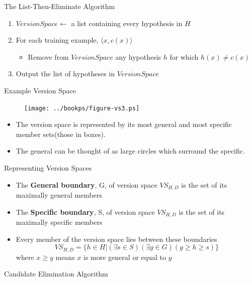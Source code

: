 \documentclass[%
pdf,
colorBG,
slideColor,
tcrico,
]{prosper}
\begin{document}


\begin{slide}{The List-Then-Eliminate Algorithm}

\begin{enumerate}
\item $VersionSpace \leftarrow$ a list containing every hypothesis in $H$
\item For each training example, $\langle x, c(x) \rangle$
	\begin{itemize}
 	\item Remove from $VersionSpace$ any hypothesis $h$ for which $h(x) \neq c(x)$
	\end{itemize}
 \item Output the list of hypotheses in $VersionSpace$
\end{enumerate}
\end{slide}


\begin{slide}{Example Version Space}
\begin{figure}
	\centering
	\texttt{[image: ../bookps/figure-vs3.ps]}
\end{figure}
\small
	\begin{itemize}
 	\item The version space is represented by its most general and most specific member sets(those in boxes). 
	\item The general can be thought of as large circles which surround the specific.
	\end{itemize}
\end{slide}

\begin{slide}{Representing Version Spaces}
\begin{itemize}
\item The {\bf General boundary}, G, of version space $VS_{H,D}$ is the set of its maximally general members
\item The {\bf Specific boundary}, S, of version space $VS_{H,D}$ is the set of its maximally specific members
\item Every member of the version space lies between these boundaries
\[VS_{H,D} = \{h \in H| (\exists s \in S)(\exists g \in G) (g \geq h \geq
s)\}\] where $x \geq y$ means $x$ is more general or equal to $y$
\end{itemize}
\end{slide}


\begin{slide}{Candidate Elimination Algorithm}

\begin{algorithm}[H]
\end{algorithm}
\end{slide}
\end{document}
